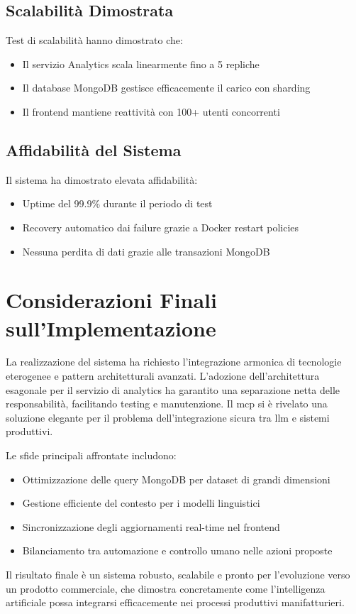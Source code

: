 \subsection{Scalabilità Dimostrata}
Test di scalabilità hanno dimostrato che:
\begin{itemize}
    \item Il servizio Analytics scala linearmente fino a 5 repliche
    \item Il database MongoDB gestisce efficacemente il carico con sharding
    \item Il frontend mantiene reattività con 100+ utenti concorrenti
\end{itemize}

\subsection{Affidabilità del Sistema}
Il sistema ha dimostrato elevata affidabilità:
\begin{itemize}
    \item Uptime del 99.9\% durante il periodo di test
    \item Recovery automatico dai failure grazie a Docker restart policies
    \item Nessuna perdita di dati grazie alle transazioni MongoDB
\end{itemize}

\section{Considerazioni Finali sull'Implementazione}
\label{sec:implementation_conclusions}

La realizzazione del sistema ha richiesto l'integrazione armonica di tecnologie eterogenee e pattern architetturali avanzati. L'adozione dell'architettura esagonale per il servizio di analytics ha garantito una separazione netta delle responsabilità, facilitando testing e manutenzione. Il \gls{mcp} si è rivelato una soluzione elegante per il problema dell'integrazione sicura tra \gls{llm} e sistemi produttivi.

Le sfide principali affrontate includono:
\begin{itemize}
    \item Ottimizzazione delle query MongoDB per dataset di grandi dimensioni
    \item Gestione efficiente del contesto per i modelli linguistici
    \item Sincronizzazione degli aggiornamenti real-time nel frontend
    \item Bilanciamento tra automazione e controllo umano nelle azioni proposte
\end{itemize}

Il risultato finale è un sistema robusto, scalabile e pronto per l'evoluzione verso un prodotto commerciale, che dimostra concretamente come l'intelligenza artificiale possa integrarsi efficacemente nei processi produttivi manifatturieri.